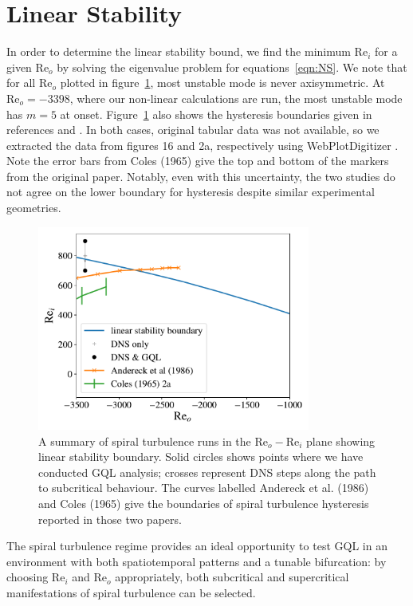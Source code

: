\documentclass[openacc]{rstransa}%
\newcommand{\Reyn}{\mathrm{Re}}
\begin{document}
\section{Linear Stability}
\label{sec:linear}
In order to determine the linear stability bound, we find the minimum $\Reyn_i$ for a given $\Reyn_o$ by solving the eigenvalue problem for equations~\ref{eqn:NS}. We note that for all $\Reyn_o$ plotted in figure~\ref{fig:LSB}, most unstable mode is never axisymmetric. At $\Reyn_o=-3398$, where our non-linear calculations are run, the most unstable mode has $m = 5$ at onset. Figure~\ref{fig:LSB} also shows the hysteresis boundaries given in references \cite{1986JFM...164..155A} and \cite{1965JFM....21..385C}. In both cases, original tabular data was not available, so we extracted the data from figures 16 and 2a, respectively using WebPlotDigitizer \cite{Rohatgi2020}. Note the error bars from Coles (1965) \cite{1965JFM....21..385C} give the top and bottom of the markers from the original paper. Notably, even with this uncertainty, the two studies do not agree on the lower boundary for hysteresis despite similar experimental geometries. 
\begin{figure}
    \centering
    \includegraphics[width=0.8\textwidth]{../figs/reo_rei_lsb.pdf}
    \caption{A summary of spiral turbulence runs in the $\Reyn_o-\Reyn_i$ plane showing linear stability boundary. Solid circles shows points where we have conducted GQL analysis; crosses represent DNS steps along the path to subcritical behaviour. The curves labelled Andereck et al. (1986) and Coles (1965) give the boundaries of spiral turbulence hysteresis reported in those two papers.}
    \label{fig:LSB}
\end{figure}
The spiral turbulence regime provides an ideal opportunity to test GQL in an environment with both spatiotemporal patterns and a tunable bifurcation: by choosing $\Reyn_i$ and $\Reyn_o$ appropriately, both subcritical and supercritical manifestations of spiral turbulence can be selected.
\end{document}
